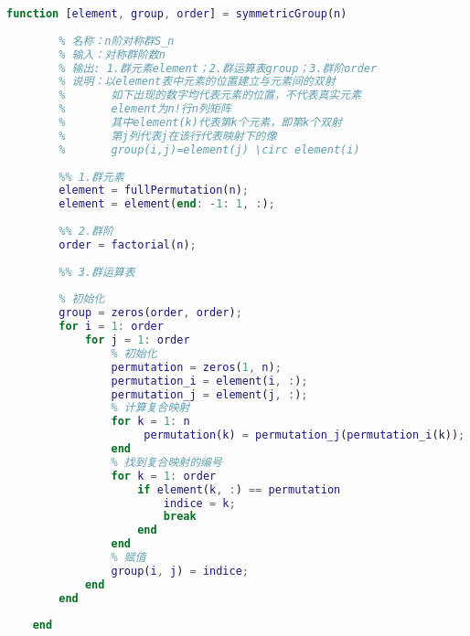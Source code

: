 \begin{lstlisting}[language=Matlab, caption={对称群}, label={symmetricGroup}]
	function [element, group, order] = symmetricGroup(n)
	
	    % 名称：n阶对称群S_n
	    % 输入：对称群阶数n
	    % 输出: 1.群元素element；2.群运算表group；3.群阶order
	    % 说明：以element表中元素的位置建立与元素间的双射
	    %       如下出现的数字均代表元素的位置，不代表真实元素
	    %       element为n!行n列矩阵
	    %       其中element(k)代表第k个元素，即第k个双射
	    %       第j列代表j在该行代表映射下的像
	    %       group(i,j)=element(j) \circ element(i)
	
	    %% 1.群元素
	    element = fullPermutation(n);
	    element = element(end: -1: 1, :);
	
	    %% 2.群阶
	    order = factorial(n);
	
	    %% 3.群运算表
	    
	    % 初始化
	    group = zeros(order, order);
	    for i = 1: order
	        for j = 1: order
	            % 初始化
	            permutation = zeros(1, n);
	            permutation_i = element(i, :);
	            permutation_j = element(j, :);
	            % 计算复合映射
	            for k = 1: n
	                 permutation(k) = permutation_j(permutation_i(k));
	            end
	            % 找到复合映射的编号
	            for k = 1: order
	                if element(k, :) == permutation
	                    indice = k;
	                    break
	                end
	            end
	            % 赋值
	            group(i, j) = indice;
	        end
	    end
	
	end
	
\end{lstlisting}

